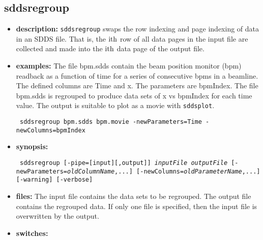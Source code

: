 %
%
\newpage

%
%
\subsection{sddsregroup}
\label{sddsregroup}

\begin{itemize}
\item {\bf description:}
%
%
\verb|sddsregroup| swaps the row indexing and page indexing of data
in an SDDS file. That is, the ${\rm i {th}}$ row of all data pages in the input file are collected
and made into the ${\rm i {th}}$ data page of the output file.
\item {\bf examples:}
%
% 
%
The file bpm.sdds contain the beam position monitor (bpm) readback as a function of time for a series
of consecutive bpms in a beamline. The defined columns are Time and x. The parameters
are bpmIndex. The file bpm.sdds is regrouped to produce data sets of x vs bpmIndex
for each time value. The output is suitable to plot as a movie with \verb|sddsplot|.
\begin{flushleft}{\tt
sddsregroup bpm.sdds bpm.movie -newParameters=Time -newColumns=bpmIndex
}\end{flushleft}
\item {\bf synopsis:} 
%
%
\begin{flushleft}{\tt
sddsregroup [-pipe=[input][,output]] {\em inputFile} {\em outputFile}
     [-newParameters={\em oldColumnName},...]
     [-newColumns={\em oldParameterName},...] [-warning] [-verbose]
}\end{flushleft}
\item {\bf files:}
The input file contains the data sets to be regrouped. The output file
contains the regrouped data.  If only one file is specified,
then the input file is overwritten by the output.
\item {\bf switches:}
%
%
    \begin{itemize}

\end{itemize}
\end{itemize}
